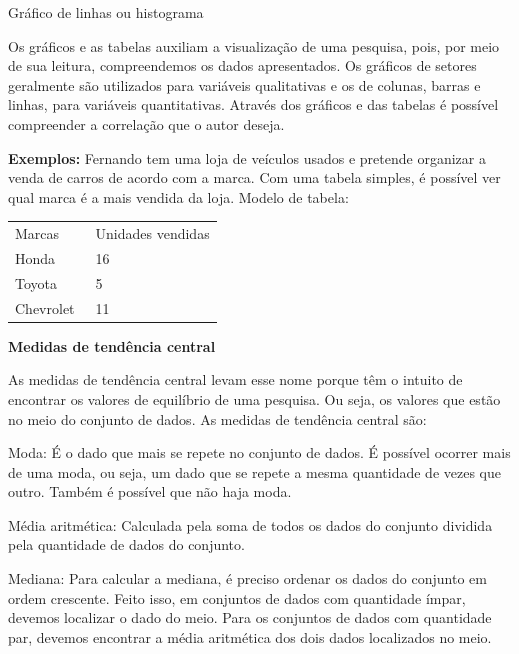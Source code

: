 
Gráfico de linhas ou histograma


Os gráficos e as tabelas auxiliam a visualização de uma pesquisa, pois,
por meio de sua leitura, compreendemos os dados apresentados. Os
gráficos de setores geralmente são utilizados para variáveis
qualitativas e os de colunas, barras e linhas, para variáveis
quantitativas. Através dos gráficos e das tabelas é possível compreender
a correlação que o autor deseja.

\textbf{Exemplos:} Fernando tem uma loja de veículos usados e pretende
organizar a venda de carros de acordo com a marca. Com uma tabela
simples, é possível ver qual marca é a mais vendida da loja. Modelo de
tabela:


\begin{longtable}[]{@{}ll@{}}
\toprule
\endhead
Marcas & Unidades vendidas\tabularnewline
Honda & 16\tabularnewline
Toyota & 5\tabularnewline
Chevrolet~ & 11\tabularnewline
\bottomrule
\end{longtable}

\textbf{Medidas de tendência central}

As medidas de tendência central levam esse nome porque têm o intuito de
encontrar os valores de equilíbrio de uma pesquisa. Ou seja, os valores
que estão no meio do conjunto de dados. As medidas de tendência central
são:

Moda: É o dado que mais se repete no conjunto de dados. É possível
ocorrer mais de uma moda, ou seja, um dado que se repete a mesma
quantidade de vezes que outro. Também é possível que não haja moda.

Média aritmética: Calculada pela soma de todos os dados do conjunto
dividida pela quantidade de dados do conjunto.

Mediana: Para calcular a mediana, é preciso ordenar os dados do conjunto
em ordem crescente. Feito isso, em conjuntos de dados com quantidade
ímpar, devemos localizar o dado do meio. Para os conjuntos de dados com
quantidade par, devemos encontrar a média aritmética dos dois dados
localizados no meio.

